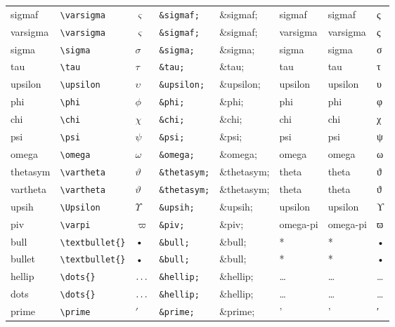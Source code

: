 \documentclass[11pt]{article}
\begin{document}
\begin{longtable}{llllllll}
sigmaf & \texttt{\textbackslash{}varsigma} & $\varsigma$ & \texttt{\&sigmaf;} & \&sigmaf; & sigmaf & sigmaf & ς\\
varsigma & \texttt{\textbackslash{}varsigma} & $\varsigma$ & \texttt{\&sigmaf;} & \&sigmaf; & varsigma & varsigma & ς\\
sigma & \texttt{\textbackslash{}sigma} & $\sigma$ & \texttt{\&sigma;} & \&sigma; & sigma & sigma & σ\\
tau & \texttt{\textbackslash{}tau} & $\tau$ & \texttt{\&tau;} & \&tau; & tau & tau & τ\\
upsilon & \texttt{\textbackslash{}upsilon} & $\upsilon$ & \texttt{\&upsilon;} & \&upsilon; & upsilon & upsilon & υ\\
phi & \texttt{\textbackslash{}phi} & $\phi$ & \texttt{\&phi;} & \&phi; & phi & phi & φ\\
chi & \texttt{\textbackslash{}chi} & $\chi$ & \texttt{\&chi;} & \&chi; & chi & chi & χ\\
psi & \texttt{\textbackslash{}psi} & $\psi$ & \texttt{\&psi;} & \&psi; & psi & psi & ψ\\
omega & \texttt{\textbackslash{}omega} & $\omega$ & \texttt{\&omega;} & \&omega; & omega & omega & ω\\
thetasym & \texttt{\textbackslash{}vartheta} & $\vartheta$ & \texttt{\&thetasym;} & \&thetasym; & theta & theta & ϑ\\
vartheta & \texttt{\textbackslash{}vartheta} & $\vartheta$ & \texttt{\&thetasym;} & \&thetasym; & theta & theta & ϑ\\
upsih & \texttt{\textbackslash{}Upsilon} & $\Upsilon$ & \texttt{\&upsih;} & \&upsih; & upsilon & upsilon & ϒ\\
piv & \texttt{\textbackslash{}varpi} & $\varpi$ & \texttt{\&piv;} & \&piv; & omega-pi & omega-pi & ϖ\\
bull & \texttt{\textbackslash{}textbullet\{\}} & $\mbox{\textbullet{}}$ & \texttt{\&bull;} & \&bull; & * & * & •\\
bullet & \texttt{\textbackslash{}textbullet\{\}} & $\mbox{\textbullet{}}$ & \texttt{\&bull;} & \&bull; & * & * & •\\
hellip & \texttt{\textbackslash{}dots\{\}} & $\mbox{\dots{}}$ & \texttt{\&hellip;} & \&hellip; & \ldots{} & \ldots{} & …\\
dots & \texttt{\textbackslash{}dots\{\}} & $\mbox{\dots{}}$ & \texttt{\&hellip;} & \&hellip; & \ldots{} & \ldots{} & …\\
prime & \texttt{\textbackslash{}prime} & $\prime$ & \texttt{\&prime;} & \&prime; & ' & ' & ′\\

\end{longtable}
\end{document}
